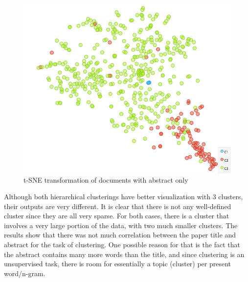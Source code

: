 \documentclass{article}
\begin{document}
\begin{figure}[htbp]
    \centering
    \includegraphics[scale=0.3]{tsne_abstract.png}
    \caption{t-SNE transformation of documents with abstract only}
    \label{fig:abstract}
\end{figure}

Although both hierarchical clusterings have better visualization with 3 clusters, their outputs are very different. It is clear that there is not any well-defined cluster since they are all very sparse. For both cases, there is a cluster that involves a very large portion of the data, with two much smaller clusters. The results show that there was not much correlation between the paper title and abstract for the task of clustering. One possible reason for that is the fact that the abstract contains many more words than the title, and since clustering is an unsupervised task, there is room for essentially a topic (cluster) per present word/n-gram.
 
\end{document}
